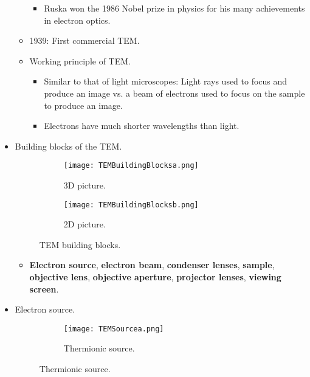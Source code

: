 \documentclass[../notes.tex]{subfiles}
\begin{document}
\begin{itemize}
\begin{itemize}
        \begin{itemize}
            \item Ruska won the 1986 Nobel prize in physics for his many achievements in electron optics.
        \end{itemize}
        \item 1939: First commercial TEM.
        \item Working principle of TEM.
        \begin{itemize}
            \item Similar to that of light microscopes: Light rays used to focus and produce an image vs. a beam of electrons used to focus on the sample to produce an image.
            \item Electrons have much shorter wavelengths than light.
        \end{itemize}
    \end{itemize}
    \item Building blocks of the TEM.
    \begin{figure}[H]
        \centering
        \begin{subfigure}[b]{0.4\linewidth}
            \centering
            \texttt{[image: TEMBuildingBlocksa.png]}
            \caption{3D picture.}
            \label{fig:TEMBuildingBlocksa}
        \end{subfigure}
        \begin{subfigure}[b]{0.4\linewidth}
            \centering
            \texttt{[image: TEMBuildingBlocksb.png]}
            \caption{2D picture.}
            \label{fig:TEMBuildingBlocksb}
        \end{subfigure}
        \caption{TEM building blocks.}
        \label{fig:TEMBuildingBlocks}
    \end{figure}
    \begin{itemize}
        \item \textbf{Electron source}, \textbf{electron beam}, \textbf{condenser lenses}, \textbf{sample}, \textbf{objective lens}, \textbf{objective aperture}, \textbf{projector lenses}, \textbf{viewing screen}.
    \end{itemize}
    \pagebreak
    \item Electron source.
    \begin{figure}[H]
        \centering
        \begin{subfigure}[b]{0.4\linewidth}
            \centering
            \texttt{[image: TEMSourcea.png]}
            \caption{Thermionic source.}

\end{subfigure}
\end{figure}
\end{itemize}
\end{document}

